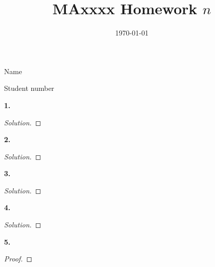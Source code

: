 \documentclass[11pt, reqno]{amsart}
\title{MAxxxx Homework $n$} %
\date{\today}
\newenvironment{statement}[1]{\smallskip\noindent\color[rgb]{0.00,0.00,1.00} {\bf #1.}}{}
\theoremstyle{definition}
\theoremstyle{remark}
\begin{document}
\maketitle

\vspace*{-0.25in}
\centerline{Name}
\centerline{Student number}
\vspace*{0.15in}

\begin{statement}{1}
	
\end{statement}

\begin{proof}[Solution]
    
\end{proof}

\begin{statement}{2}
	
\end{statement}

\begin{proof}[Solution]
	
\end{proof}

\begin{statement}{3}
	
\end{statement}

\begin{proof}[Solution]
	
\end{proof}

\begin{statement}{4}

\end{statement}

\begin{proof}[Solution]
	
\end{proof}

\begin{statement}{5}
	
\end{statement}

\begin{proof}
	
\end{proof}
\end{document}
